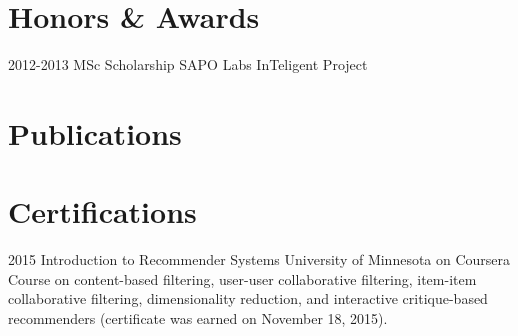 \documentclass[]{friggeri-cv} %
\begin{document}

\section{Honors \& Awards}

\begin{entrylist}
\entry
{2012-2013}
{MSc Scholarship}
{SAPO Labs}
{InTeligent Project}
\end{entrylist}


\section{Publications}

\begin{refsection} %
\nocite{*}
\printbibliography[sorting=chronological, type=inproceedings, title={international peer-reviewed conferences/proceedings}, notkeyword={france}, heading=subbibliography]
\end{refsection}




\section{Certifications}

\begin{entrylist}
\entry
{2015}
{Introduction to Recommender Systems}
{University of Minnesota on Coursera}
{Course on content-based filtering, user-user collaborative filtering, item-item collaborative filtering, dimensionality reduction, and interactive critique-based recommenders (certificate was earned on November 18, 2015).}
\end{entrylist}
\end{document}
